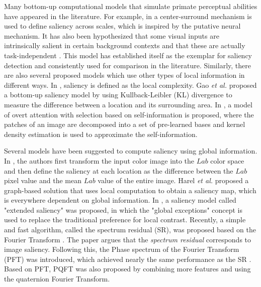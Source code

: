 \documentclass[10pt,journal,cspaper,compsoc]{IEEEtran}
\begin{document}
Many bottom-up computational models that simulate primate perceptual abilities have appeared in the literature. For example, in \cite{Itti_etal98pami, Itti_Koch01nrn, itti2000saliency} a center-surround mechanism is used to define saliency across scales, which is inspired by the putative neural mechanism. It has also been hypothesized that some visual inputs are intrinsically salient in certain background contexts and that these are actually task-independent \cite{Itti_etal98pami, Itti_Koch01nrn}. This model has established itself as the exemplar for saliency detection and consistently used for comparison in the literature. Similarly, there are also several proposed models which use other types of local information in different ways. In \cite{kadir2001saliency}, saliency is defined as the local complexity. Gao {\it et al.} \cite{gao2009discriminant,gao2007bottom,gao2008plausibility} proposed a bottom-up saliency model by using Kullback-Leibler (KL) divergence to measure the difference between a location and its surrounding area. In \cite{NIPS2005_81}, a model of overt attention with selection based on self-information is proposed, where the patches of an image are decomposed into a set of pre-learned bases and kernel density estimation is used to approximate the self-information.

Several models have been suggested to compute saliency using global information. In \cite{LCAV-CONF-2009-012}, the authors first transform the input color image into the $Lab$ color space and then define the saliency at each location as the difference between the $Lab$ pixel value and the mean $Lab$ value of the entire image. Harel {\it et al.} \cite{NIPS2006_897} proposed a graph-based solution that uses local computation to obtain a saliency map, which is everywhere dependent on global information. In \cite{avraham2009esaliency}, a saliency model called "extended saliency" was proposed, in which the "global exceptions" concept is used to replace the traditional preference for local contrast. Recently, a simple and fast algorithm, called the spectrum residual (SR), was proposed based on the Fourier Transform \cite{hou2007saliency}. The paper argues that the {\it spectrum residual} corresponds to image saliency. Following this, the Phase spectrum of the Fourier Transform (PFT) was introduced, which achieved nearly the same performance as the SR \cite{guo2008spatio}. Based on PFT, PQFT \cite{guo2008spatio} was also proposed by combining more features and using the quaternion Fourier Transform.
\end{document}
